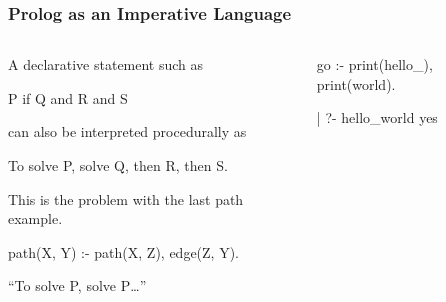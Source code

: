\documentclass{plt}
\begin{document}
\begin{frame}[fragile]
  \frametitle{Prolog as an Imperative Language}

  \begin{columns}
    \begin{column}{0.6\textwidth}

\parskip=1pc

A declarative statement such as

\shadowstart
P if Q and R and S
\shadowend

can also be interpreted procedurally as

\shadowstart
To solve P, solve Q, then R, then S.
\shadowend

This is the problem with the last path example.

\begin{prolog}
path(X, Y) :-
   path(X, Z), edge(Z, Y).
\end{prolog}

``To solve P, solve P\ldots''
    \end{column}
    \begin{column}{0.4\textwidth}

\begin{prolog}
go :- print(hello_),
      print(world).
\end{prolog}

\begin{interactive}
| ?- 
hello_world
yes
\end{interactive}
    \end{column}
  \end{columns}

\end{frame}
\end{document}
